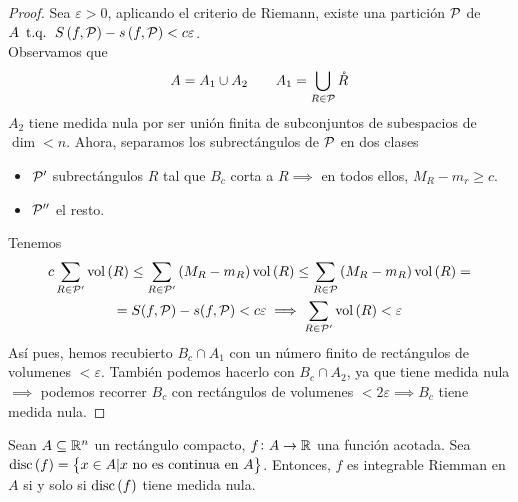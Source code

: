 \begin{proof}
    Sea $\varepsilon > 0$, aplicando el criterio de Riemann, existe una partición $\mathcal{P}$ de $A \operatorname{\text{ t.q. }} S \left( f, \mathcal{P} \right) - s \left( f, \mathcal{P} \right) < c\varepsilon$. \\
    Observamos que 
    \[
	    A = A_1 \cup A_2 \qquad A_1 = \bigcup_{R \in \mathcal{P}} \mathring{R}
    \]
    $A_2$ tiene medida nula por ser unión finita de subconjuntos de subespacios de
    $\dim < n$. Ahora, separamos los subrectángulos de $\mathcal{P}$ en dos clases
    \begin{itemize}
	    \item $\mathcal{P}^\prime$ subrectángulos $R$ tal que $B_c$ corta a $R \implies$ en
		    todos ellos, $M_R - m_r \geq c$.
	    \item $\mathcal{P}^{\prime\prime}$ el resto.
    \end{itemize}
    Tenemos
    \begin{gather*}
	    c \sum_{R \in \mathcal{P}^\prime}\operatorname{vol}\left( R \right) \leq 
	    \sum_{R \in \mathcal{P}^\prime}\left( M_R - m_R \right) \operatorname{vol}\left( R \right) \leq
	    \sum_{R \in \mathcal{P}} \left( M_R -m_R \right)\operatorname{vol} \left( R \right) =\\=
	    S(f, \mathcal{P}) - s(f, \mathcal{P}) < c\varepsilon \implies \sum_{R \in \mathcal{P}^\prime}
	    \operatorname{vol}\left( R \right) < \varepsilon
    \end{gather*}
    Así pues, hemos recubierto $B_c \cap A_1$ con un número finito de rectángulos de
    volumenes $< \varepsilon$. Tambi\'en podemos hacerlo con $B_c \cap A_2$, ya que
    tiene medida nula $\implies$ podemos recorrer $B_c$ con rectángulos de volumenes
    $< 2\varepsilon \implies B_c$ tiene medida nula.
\end{proof}

\begin{teo}[de Lebesque]
	Sean $A \subseteq \mathbb{R}^n$ un rectángulo compacto, $f \colon A \to \mathbb{R}$ una
	función acotada. Sea $\operatorname{disc}\left( f \right) = \left\{x \in A \vert x \text{ no
	es continua en }A\right\}$. Entonces, $f$ es integrable Riemman en $A$ si y solo si
	$\operatorname{disc}\left( f \right)$ tiene medida nula.
\end{teo}

